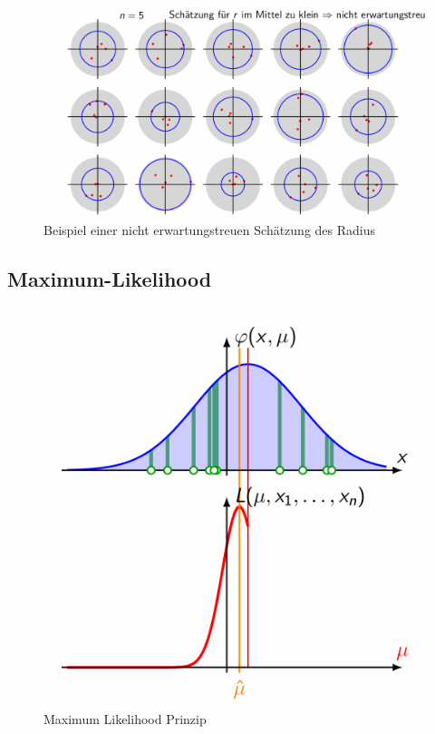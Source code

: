 \documentclass[../Main.tex]{subfiles}
\begin{document}

\begin{figure}[H]
    \centering
    \includegraphics[width=1\linewidth]{Images/beispiel-nichterwartungstreu-radius.png}
    \caption{Beispiel einer nicht erwartungstreuen Schätzung des Radius}
\end{figure}

\subsection{Maximum-Likelihood}
\begin{figure}[H]
    \centering
    \includegraphics[width=0.5\linewidth]{Images/maximum-likelihood.png}
    \caption{Maximum Likelihood Prinzip}
\end{figure}
\end{document}
